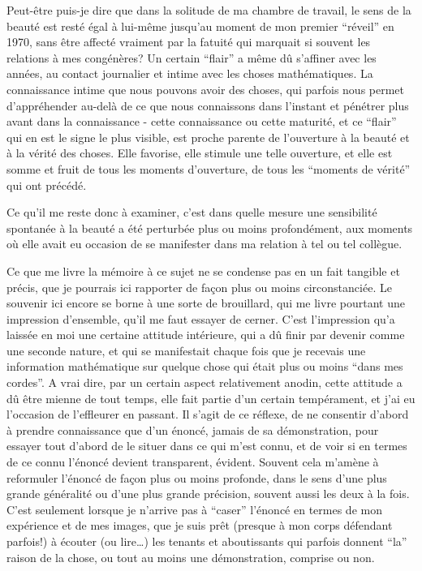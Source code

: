 Peut-être puis-je dire que dans la solitude de ma chambre de travail, le sens de la beauté est resté égal à lui-même jusqu'au moment de mon premier ``réveil'' en 1970, sans être affecté vraiment par la fatuité qui marquait si souvent les relations à mes congénères? Un certain ``flair'' a même dû s'affiner avec les années, au contact journalier et intime avec les choses mathématiques. La connaissance intime que nous pouvons avoir des choses, qui parfois nous permet d'appréhender au-delà de ce que nous connaissons dans l'instant et pénétrer plus avant dans la connaissance - cette connaissance ou cette maturité, et ce ``flair'' qui en est le signe le plus visible, est proche parente de l'ouverture à la beauté et à la vérité des choses. Elle favorise, elle stimule une telle ouverture, et elle est somme et fruit de tous les moments d'ouverture, de tous les ``moments de vérité'' qui ont précédé.

Ce qu'il me reste donc à examiner, c'est dans quelle mesure une sensibilité spontanée à la beauté a été perturbée plus ou moins profondément, aux moments où elle avait eu occasion de se manifester dans ma relation à tel ou tel collègue.

Ce que me livre la mémoire à ce sujet ne se condense pas en un fait tangible et précis, que je pourrais ici rapporter de façon plus ou moins circonstanciée. Le souvenir ici encore se borne à une sorte de brouillard, qui me livre pourtant une impression d'ensemble, qu'il me faut essayer de cerner. C'est l'impression qu'a laissée en moi une certaine attitude intérieure, qui a dû finir par devenir comme une seconde nature, et qui se manifestait chaque fois que je recevais une information mathématique sur quelque chose qui était plus ou moins ``dans mes cordes''. A vrai dire, par un certain aspect relativement anodin, cette attitude a dû être mienne de tout temps, elle fait partie d'un certain tempérament, et j'ai eu l'occasion de l'effleurer en passant. Il s'agit de ce réflexe, de ne consentir d'abord à prendre connaissance que d'un énoncé, jamais de sa démonstration, pour essayer tout d'abord de le situer dans ce qui m'est connu, et de voir si en termes de ce connu l'énoncé devient transparent, évident. Souvent cela m'amène à reformuler l'énoncé de façon plus ou moins profonde, dans le sens d'une plus grande généralité ou d'une plus grande précision, souvent aussi les deux à la fois. C'est seulement lorsque je n'arrive pas à ``caser'' l'énoncé en termes de mon expérience et de mes images, que je suis prêt (presque à mon corps défendant parfois!) à écouter (ou lire\ldots) les tenants et aboutissants qui parfois donnent ``la'' raison de la chose, ou tout au moins une démonstration, comprise ou non.

